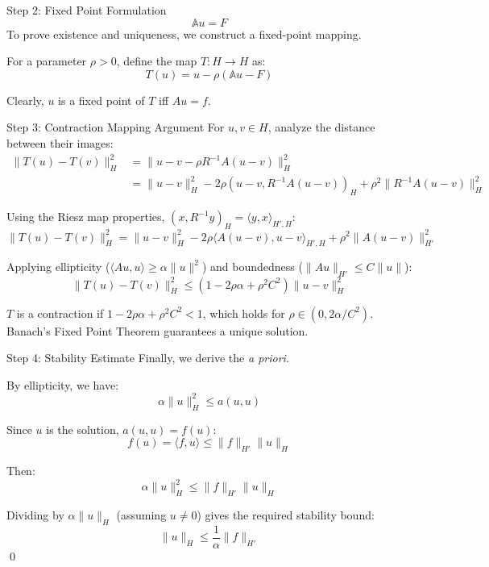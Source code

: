 \documentclass[aspectratio=169]{beamer}
\begin{document}
\begin{frame}{Step 2: Fixed Point Formulation}
        $$ \mathbb A u = F $$
    To prove existence and uniqueness, we construct a fixed-point mapping.

    For a parameter $\rho > 0$, define the map $T: H \to H$ as:
    $$ T(u) = u - \rho (\mathbb Au - F) $$

    Clearly, $u$ is a fixed point of $T$ iff $Au = f$. 

\end{frame}

\begin{frame}{Step 3: Contraction Mapping Argument}
    For $u, v \in H$, analyze the distance between their images:
    \begin{align*}
        \|T(u) - T(v)\|_H^2 &= \|u - v - \rho R^{-1}A(u - v)\|_H^2 \\
        &= \|u - v\|_H^2 - 2\rho(u - v, R^{-1}A(u - v))_H + \rho^2\|R^{-1}A(u - v)\|_H^2
    \end{align*}

    Using the Riesz map properties, $(x, R^{-1}y)_H = \langle y, x \rangle_{H',H}$:
    $$ \|T(u) - T(v)\|_H^2 = \|u - v\|_H^2 - 2\rho\langle A(u - v), u - v \rangle_{H',H} + \rho^2\|A(u - v)\|_{H'}^2 $$

    Applying ellipticity ($\langle Au, u \rangle \ge \alpha\|u\|^2$) and boundedness ($\|Au\|_{H'} \le C\|u\|$):
    $$ \|T(u) - T(v)\|_H^2 \le (1 - 2\rho\alpha + \rho^2 C^2)\|u - v\|_H^2 $$

    $T$ is a contraction if $1 - 2\rho\alpha + \rho^2 C^2 < 1$, which holds for $\rho \in (0, 2\alpha/C^2)$. Banach's Fixed Point Theorem guarantees a unique solution.
\end{frame}

\begin{frame}{Step 4: Stability Estimate}
    Finally, we derive the \textit{a priori}.

    By ellipticity, we have:
    $$ \alpha\|u\|_H^2 \le a(u, u) $$

    Since $u$ is the solution, $a(u,u) = f(u)$:
    $$ f(u) = \langle f, u \rangle \le \|f\|_{H'}\|u\|_H $$

    Then:
    $$ \alpha\|u\|_H^2 \le \|f\|_{H'}\|u\|_H $$

    Dividing by $\alpha\|u\|_H$ (assuming $u \neq 0$) gives the required stability bound:
    $$ \|u\|_H \le \frac{1}{\alpha}\|f\|_{H'} $$
    \qed
\end{frame}

\begin{frame}
    \maketitle
\end{frame}
\end{document}
